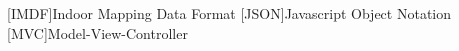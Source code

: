 \section*{}

\begin{acronym}
	[IMDF]{Indoor Mapping Data Format}
	[JSON]{Javascript Object Notation}
	[MVC]{Model-View-Controller}
\end{acronym}

\clearpage
